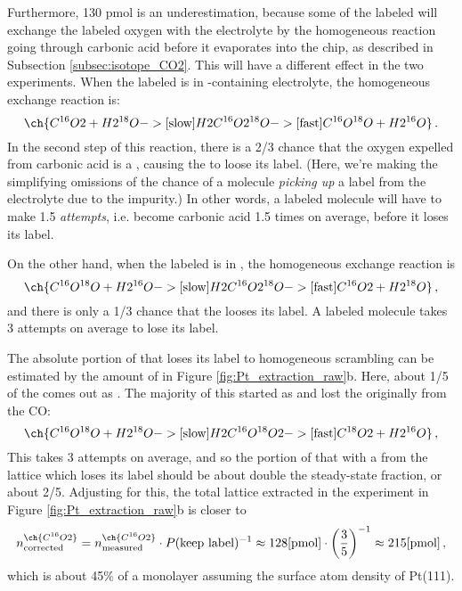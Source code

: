Furthermore, 130 pmol is an underestimation, because some of the labeled  will exchange the labeled oxygen with the electrolyte by the homogeneous reaction going through carbonic acid before it evaporates into the chip, as described in Subsection \ref{subsec:isotope_CO2}. This will have a different effect in the two experiments. When the labeled  is  in -containing electrolyte, the homogeneous exchange reaction is:
\begin{equation}
\ch{C^{16}O2 + H2^{18}O ->[\text{slow}] H2C^{16}O2^{18}O ->[\text{fast}] C^{16}O^{18}O + H2^{16}O}\,.
\end{equation}
In the second step of this reaction, there is a 2/3 chance that the oxygen expelled from carbonic acid is a , causing the  to loose its label. (Here, we're making the simplifying omissions of the chance of a  molecule \textit{picking up} a label from the electrolyte due to the  impurity.) In other words, a labeled  molecule will have to make 1.5 \textit{attempts}, i.e. become carbonic acid 1.5 times on average, before it loses its label. 

 On the other hand, when the labeled  is  in , the homogeneous exchange reaction is
\begin{equation}
\ch{C^{16}O^{18}O + H2^{16}O ->[\text{slow}] H2C^{16}O2^{18}O ->[\text{fast}] C^{16}O2 + H2^{18}O}\,,
\end{equation}
and there is only a 1/3 chance that the  looses its label. A labeled  molecule takes 3 attempts on average to lose its label. 

The absolute portion of  that loses its label to homogeneous scrambling can be estimated by the amount of  in Figure \ref{fig:Pt_extraction_raw}b. Here, about 1/5 of the  comes out as . The majority of this  started as  and lost the  originally from the CO:
\begin{equation}
\ch{C^{16}O^{18}O + H2^{18}O ->[\text{slow}] H2C^{16}O^{18}O2 ->[\text{fast}] C^{18}O2 + H2^{16}O}\,,
\end{equation}
This takes 3 attempts on average, and so the portion of  that with a  from the lattice which loses its label should be about double the steady-state  fraction, or about 2/5. Adjusting for this, the total lattice  extracted in the experiment in Figure \ref{fig:Pt_extraction_raw}b is closer to 
\begin{equation}
n^{\ch{C^{16}O2}}_\text{corrected} = n^{\ch{C^{16}O2}}_{\text{measured}} \cdot P(\text{keep label})^{-1} \approx 128 \text{[pmol]} \cdot \left(\frac{3}{5}\right)^{-1} \approx 215 \text{[pmol]}\,,
\end{equation}
which is about 45\% of a monolayer assuming the surface atom density of Pt(111).

